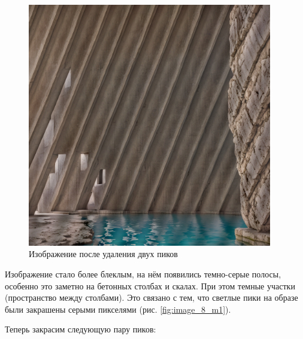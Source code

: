 \begin{figure}[ht!]
    \centering
    \includegraphics[width=0.95\textwidth]{images/result/task_1/result_8_1.png}
    \caption{Изображение после удаления двух пиков}
    \label{fig:photo_8_m1}
\end{figure}

Изображение стало более блеклым, на нём появились темно-серые полосы, особенно это заметно на бетонных столбах и скалах. При этом темные участки (пространство между столбами). Это связано с тем, что светлые пики на образе были закрашены серыми пикселями (рис. \ref{fig:image_8_m1}).

Теперь закрасим следующую пару пиков:


